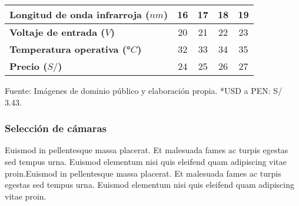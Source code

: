 \begin{mytable}[H]
\begin{tabular}{l|c|c|c|c|}
		\multicolumn{1}{|l|}{
			\begin{minipage}{\myforthmaxsizeofcontenttable}	
				\textbf{Longitud de onda infrarroja ($nm$)}
			\end{minipage}
		} & 16  & 17  & 18 & 19 \\ \hline
		\multicolumn{1}{|l|}{
			\begin{minipage}{\myforthmaxsizeofcontenttable}	
				\textbf{Voltaje de entrada ($V$)}
			\end{minipage}
		} & 20  & 21         & 22         & 23         \\ \hline
		\multicolumn{1}{|l|}{
			\begin{minipage}{\myforthmaxsizeofcontenttable}	
				\textbf{Temperatura operativa (°$C$)}
			\end{minipage}
		} & 32 & 33 & 34 & 35 \\ \hline
		\multicolumn{1}{|l|}{
			\begin{minipage}{\myforthmaxsizeofcontenttable}	
				\textbf{Precio ($S/$)}
			\end{minipage}
		} & 24 & 25 & 26 & 27 \\ \hline
	\end{tabular}
	\begin{flushleft}	
		Fuente: Imágenes de dominio público y elaboración propia.
		*USD a PEN: S/ 3.43.
	\end{flushleft}
\end{mytable}



\subsubsection{Selección de cámaras} 

Euismod in pellentesque massa placerat. Et malesuada fames ac turpis egestas sed tempus urna. Euismod elementum nisi quis eleifend quam adipiscing vitae proin.Euismod in pellentesque massa placerat. Et malesuada fames ac turpis egestas sed tempus urna. Euismod elementum nisi quis eleifend quam adipiscing vitae proin.

